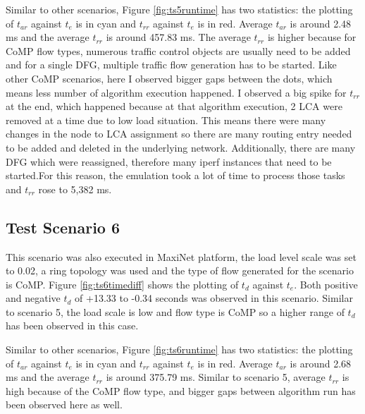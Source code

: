 Similar to other scenarios, Figure \ref{fig:ts5runtime} has two statistics: the plotting of $t_{ar}$ against $t_e$ is in cyan and $t_{rr}$ against $t_e$ is in red. Average $t_{ar}$ is around 2.48 ms and the average $t_{rr}$ is around 457.83 ms. The average $t_{rr}$ is higher because for CoMP flow types, numerous traffic control objects are usually need to be added and for a single DFG, multiple traffic flow generation has to be started. Like other CoMP scenarios, here I observed bigger gaps between the dots, which means less number of algorithm execution happened. I observed a big spike for $t_{rr}$ at the end, which happened because at that algorithm execution, 2 LCA were removed at a time due to low load situation. This means there were many changes in the node to LCA assignment so there are many routing entry needed to be added and deleted in the underlying network. Additionally, there are many DFG which were reassigned, therefore many iperf instances that need to be started.For this reason, the emulation took a lot of time to process those tasks and $t_{rr}$ rose to 5,382 ms.

\subsection{Test Scenario 6}
This scenario was also executed in MaxiNet platform, the load level scale was set to 0.02, a ring topology was used and the type of flow generated for the scenario is CoMP. Figure \ref{fig:ts6timediff} shows the plotting of $t_d$ against $t_e$. Both positive and negative $t_d$ of +13.33 to -0.34 seconds was observed in this scenario. Similar to scenario 5, the load scale is low and flow type is CoMP so a higher range of $t_d$ has been observed in this case.

\begin{figure}[H]
	\begin{center}
	\end{center}
\end{figure}

Similar to other scenarios, Figure \ref{fig:ts6runtime} has two statistics: the plotting of $t_{ar}$ against $t_e$ is in cyan and $t_{rr}$ against $t_e$ is in red. Average $t_{ar}$ is around 2.68 ms and the average $t_{rr}$ is around 375.79 ms. Similar to scenario 5, average $t_{rr}$ is high because of the CoMP flow type, and bigger gaps between algorithm run has been observed here as well. 

